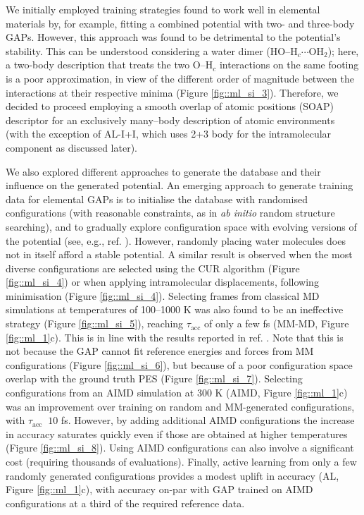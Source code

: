 \documentclass[../../main.tex]{subfiles}
\newcommand{\taua}{$\tau_\text{acc}$ }
\begin{document}
We initially employed training strategies found to work well in elemental materials by, for example, fitting a combined potential with two- and three-body GAPs. However, this approach was found to be detrimental to the potential’s stability. This can be understood considering a water dimer (HO–H${}_c \cdots$OH${}_2$); here, a two-body description that treats the two O–H${}_c$ interactions on the same footing is a poor approximation, in view of the different order of magnitude between the interactions at their respective minima (Figure \ref{fig::ml_si_3}). Therefore, we decided to proceed employing a smooth overlap of atomic positions\cite{Bartok2013} (SOAP) descriptor for an exclusively many–body description of atomic environments (with the exception of AL-I+I, which uses 2+3 body for the intramolecular component as discussed later). 

We also explored different approaches to generate the database and their influence on the generated potential. An emerging approach to generate training data for elemental GAPs is to initialise the database with randomised configurations (with reasonable constraints, as in \emph{ab initio} random structure searching\cite{Pickard2011}), and to gradually explore configuration space with evolving versions of the potential (see, e.g., ref. \cite{Bernstein2019}). However, randomly placing water molecules does not in itself afford a stable potential. A similar result is observed when the most diverse configurations are selected using the CUR algorithm\cite{Mahoney2009, Bernstein2019} (Figure \ref{fig::ml_si_4}) or when applying intramolecular displacements, following minimisation (Figure \ref{fig::ml_si_4}). Selecting frames from classical MD simulations at temperatures of 100–1000 K was also found to be an ineffective strategy (Figure \ref{fig::ml_si_5}), reaching \taua of only a few fs (MM-MD, Figure \ref{fig::ml_1}c). This is in line with the results reported in ref. \cite{Cole2020}. Note that this is not because the GAP cannot fit reference energies and forces from MM configurations (Figure \ref{fig::ml_si_6}), but because of a poor configuration space overlap with the ground truth PES (Figure \ref{fig::ml_si_7}). Selecting configurations from an AIMD simulation at 300 K (AIMD, Figure \ref{fig::ml_1}c) was an improvement over training on random and MM-generated configurations, with \taua $~10$ fs. However, by adding additional AIMD configurations the increase in accuracy saturates quickly even if those are obtained at higher temperatures (Figure \ref{fig::ml_si_8}). Using AIMD configurations can also involve a significant cost (requiring thousands of evaluations). Finally, active learning from only a few randomly generated configurations provides a modest uplift in accuracy (AL, Figure \ref{fig::ml_1}c), with accuracy on-par with GAP trained on AIMD configurations at a third of the required reference data.
\end{document}
